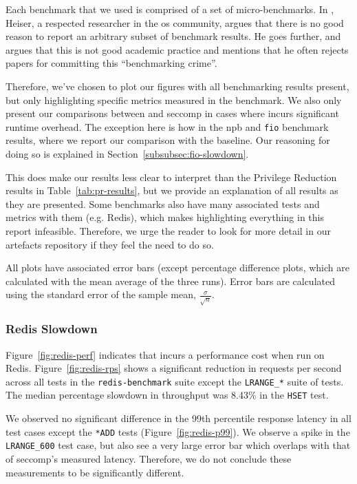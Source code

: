 Each benchmark that we used is comprised of a set of micro-benchmarks. In
\textcite{HeiserBenchmarkingCrimes}, Heiser, a respected researcher in the
\ac{os} community, argues that there is no good reason to report an arbitrary
subset of benchmark results. He goes further, and argues that this is not good
academic practice and mentions that he often rejects papers for committing this
``benchmarking crime''. 

Therefore, we've chosen to plot our figures with all benchmarking results
present, but only highlighting specific metrics measured in the benchmark. We
also only present our comparisons between \af and seccomp in cases where \af
incurs significant runtime overhead. The exception here is how in the \ac{npb}
and \texttt{fio} benchmark results, where we report our comparison with the
baseline. Our reasoning for doing so is explained in 
Section~\ref{subsubsec:fio-slowdown}. 

This does make our results less clear to interpret than the Privilege Reduction
results in Table~\ref{tab:pr-results}, but we provide an explanation of all
results as they are presented. Some benchmarks also have many associated tests
and metrics with them (e.g. Redis), which makes highlighting everything in this
report infeasible. Therefore, we urge the reader to look for more detail in our
artefacts repository if they feel the need to do so.

All plots have associated error bars (except percentage difference plots, which
are calculated with the mean average of the three runs). Error bars are
calculated using the standard error of the sample mean, 
$\frac{\sigma}{\sqrt n}$.

\subsubsection{Redis Slowdown}\label{subsubsec:redis-slowdown}

Figure~\ref{fig:redis-perf} indicates that \af incurs a performance cost when
run on Redis. Figure~\ref{fig:redis-rps} shows a significant reduction in
requests per second across all tests in the \texttt{redis-benchmark} suite
except the \texttt{LRANGE\_*} suite of tests. The median percentage slowdown in
throughput was 8.43\% in the \texttt{HSET} test.

We observed no significant difference in the 99th percentile response
latency in all test cases except the \texttt{*ADD} tests 
(Figure~\ref{fig:redis-p99}). We observe a spike in the \texttt{LRANGE\_600}
test case, but also see a very large error bar which overlaps with that of
seccomp's measured latency. Therefore, we do not conclude these measurements to
be significantly different.

